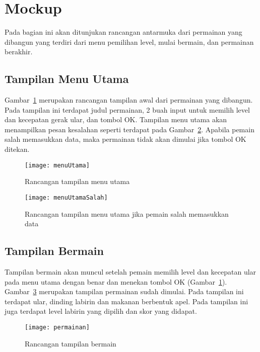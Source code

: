 \begin{enumerate}
\end{enumerate} 

\section{Mockup}
Pada bagian ini akan ditunjukan rancangan antarmuka dari permainan yang dibangun yang terdiri dari menu pemilihan level, mulai bermain, dan permainan berakhir.

\subsection{Tampilan Menu Utama}
Gambar~\ref{fig:menuUtama} merupakan rancangan tampilan awal dari permainan yang dibangun. Pada tampilan ini terdapat judul permainan, 2 buah input untuk memilih level dan kecepatan gerak ular, dan tombol OK. Tampilan menu utama akan menampilkan pesan kesalahan seperti terdapat pada Gambar~\ref{fig:menuUtamaSalah}. Apabila pemain salah memasukkan data, maka permainan tidak akan dimulai jika tombol OK ditekan.

\begin{figure}[H]
	\centering  
	\texttt{[image: menuUtama]}  
	\caption[Rancangan tampilan menu utama]{Rancangan tampilan menu utama}
	\label{fig:menuUtama} 
\end{figure}

\begin{figure}[H]
	\centering  
	\texttt{[image: menuUtamaSalah]}  
	\caption[Rancangan tampilan menu utama jika pemain salah memasukkan data]{Rancangan tampilan menu utama jika pemain salah memasukkan data}
	\label{fig:menuUtamaSalah} 
\end{figure}

\subsection{Tampilan Bermain}
Tampilan bermain akan muncul setelah pemain memilih level dan kecepatan ular pada menu utama dengan benar dan menekan tombol OK (Gambar~\ref{fig:menuUtama}). Gambar~\ref{fig:permainan} merupakan tampilan permainan sudah dimulai. Pada tampilan ini terdapat ular, dinding labirin dan makanan berbentuk apel. Pada tampilan ini juga terdapat level labirin yang dipilih dan skor yang didapat. 

\begin{figure}[H]
	\centering  
	\texttt{[image: permainan]}  
	\caption[Rancangan tampilan bermain]{Rancangan tampilan bermain}
	\label{fig:permainan} 
\end{figure}

